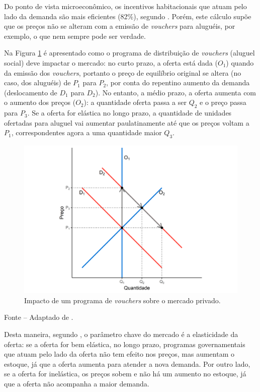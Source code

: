 \documentclass[
	12pt,				%
	oneside,			%
	a4paper,			%
	chapter=TITLE,		%
	section=TITLE,		%
	english,			%
	brazil				%
	]{abntex2}
\newcommand{\bcenter}{\begin{center}}
\newcommand{\ecenter}{\end{center}}
\begin{document}
\begin{refsection}
Do ponto de vista microeconômico, os incentivos habitacionais que atuam pelo
lado da demanda são mais eficientes (82\%), segundo \textcite{malpezzi_affordable_2018_1}.
Porém, este cálculo supõe que os preços não se alteram com a emissão de
\emph{vouchers} para aluguéis, por exemplo, o que nem sempre pode ser verdade.

Na Figura \ref{fig:vouchers2} é apresentado como o programa de distribuição de
\emph{vouchers} (aluguel social) deve impactar o mercado: no curto prazo, a oferta
está dada (\(O_1\)) quando da emissão dos \emph{vouchers}, portanto o preço de
equilíbrio original se altera (no caso, dos aluguéis) de \(P_1\) para \(P_2\), por
conta do repentino aumento da demanda (deslocamento de \(D_1\) para \(D_2\)). No
entanto, a médio prazo, a oferta aumenta com o aumento dos preços (\(O_2\)): a
quantidade oferta passa a ser \(Q_2\) e o preço passa para \(P_3\). Se a oferta for
elástica no longo prazo, a quantidade de unidades ofertadas para aluguel vai
aumentar paulatinamente até que os preços voltam a \(P_1\), correspondentes agora
a uma quantidade maior \(Q_3\).
\begin{figure}[H]

{\centering \includegraphics[width=0.7\linewidth]{images/vouchers2-1} 

}

\caption{Impacto de um programa de \emph{vouchers} sobre o mercado privado.}\label{fig:vouchers2}
\end{figure}
\bcenter

\small Fonte -- Adaptado de \textcite{malpezzi_affordable_2018_2}.
\ecenter

Desta maneira, segundo \textcite{malpezzi_affordable_2018_2}, o parâmetro chave do mercado
é a elasticidade da oferta: se a oferta for bem elástica, no longo prazo,
programas governamentais que atuam pelo lado da oferta não tem efeito nos
preços, mas aumentam o estoque, já que a oferta aumenta para atender a nova
demanda. Por outro lado, se a oferta for inelástica, os preços sobem e não há
um aumento no estoque, já que a oferta não acompanha a maior demanda.


\end{refsection}
\end{document}
